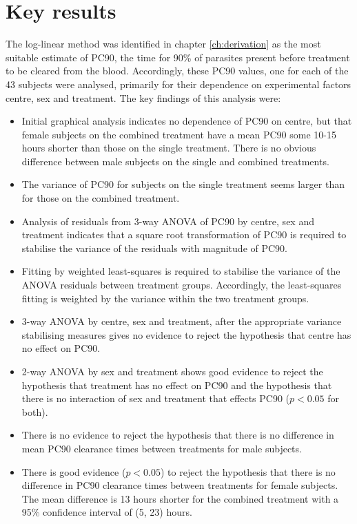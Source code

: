 \section{Key results}
The log-linear method was identified in chapter \ref{ch:derivation} as the most suitable estimate of PC90, the time for 90\% of parasites present before treatment to be cleared from the blood. Accordingly, these PC90 values, one for each of the 43 subjects were analysed, primarily for their dependence on experimental factors centre, sex and treatment. The key findings of this analysis were:
\begin{itemize}
\item Initial graphical analysis indicates no dependence of PC90 on centre, but that female subjects on the combined treatment have a mean PC90 some 10-15 hours shorter than those on the single treatment. There is no obvious difference between male subjects on the single and combined treatments.
\item The variance of PC90 for subjects on the single treatment seems larger than for those on the combined treatment.
\item Analysis of residuals from 3-way ANOVA of PC90 by centre, sex and treatment indicates that a square root transformation of PC90 is required to stabilise the variance of the residuals with magnitude of PC90.
\item Fitting by weighted least-squares is required to stabilise the variance of the ANOVA residuals between treatment groups. Accordingly, the least-squares fitting is weighted by the variance within the two treatment groups. 
\item 3-way ANOVA by centre, sex and treatment, after the appropriate variance stabilising measures gives no evidence to reject the hypothesis that centre has no effect on PC90.
\item 2-way ANOVA by sex and treatment shows good evidence to reject the hypothesis that treatment has no effect on PC90 and the hypothesis that there is no interaction of sex and treatment that effects PC90 ($p<0.05$ for both).
\item There is no evidence to reject the hypothesis that there is no difference in mean PC90 clearance times between treatments for male subjects.
\item There is good evidence ($p<0.05$) to reject the hypothesis that there is no difference in PC90 clearance times between treatments for female subjects. The mean difference is 13 hours shorter for the combined treatment with a 95\% confidence interval of (5, 23) hours.

\end{itemize}
